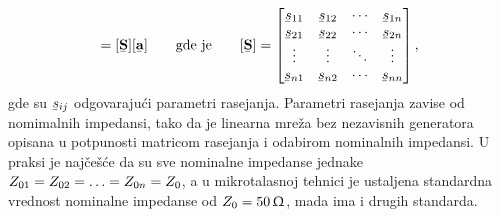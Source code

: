 \documentclass[a4paper, 12pt, diplomski]{etf}
\renewcommand{\unit}[1]{\,{\rm #1}}   %
\newcommand{\faz}[1]{\underaccent{\bar}{#1}}
\begin{document}
\begin{equation}
[\faz{\bf b}] = [\faz{\bf S}] [\faz{\bf a}] 
\quad \quad \text{gde je} \quad \quad
[\faz {\bf S}]
=
\begin{bmatrix}
\faz s_{11} & \faz s_{12} & \cdots & \faz s_{1n}\\ 
\faz s_{21} & \faz s_{22} & \cdots & \faz s_{2n} \\
\vdots & \vdots & \ddots & \vdots \\ 
\faz s_{n1} & \faz s_{n2} & \cdots & \faz s_{nn}
\end{bmatrix}, 
    \label{eq:spar}
\end{equation}
%
gde su $\faz s_{ij}$ odgovarajući parametri rasejanja.
Parametri rasejanja zavise od nomimalnih impedansi,
tako da je linearna mreža bez nezavisnih
generatora opisana u potpunosti 
matricom rasejanja i odabirom nominalnih 
impedansi. U praksi je najčešće da su sve 
nominalne impedanse jednake  $Z_{\rm 01} = Z_{\rm 02} = \ldots = Z_{0n} = Z_0$, a u mikrotalasnoj tehnici je 
ustaljena standardna vrednost nominalne impedanse 
od $Z_0 = 50\unit{\Upomega}$, mada ima i drugih standarda.
\end{document}
